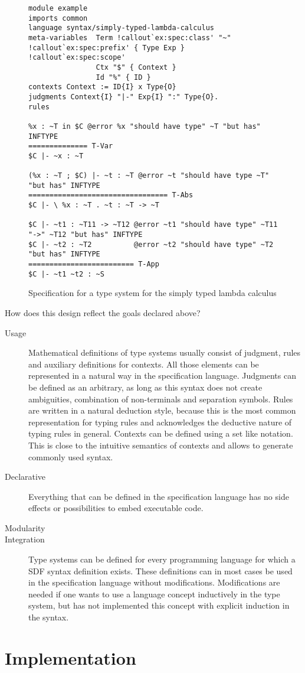 \begin{figure}
\scriptsize
\begin{verbatim}
module example
imports common
language syntax/simply-typed-lambda-calculus
meta-variables 	Term !callout`ex:spec:class' "~" !callout`ex:spec:prefix' { Type Exp } !callout`ex:spec:scope'
                Ctx "$" { Context }
                Id "%" { ID }
contexts Context := ID{I} x Type{O}
judgments Context{I} "|-" Exp{I} ":" Type{O}.
rules

%x : ~T in $C @error %x "should have type" ~T "but has" INFTYPE
============== T-Var
$C |- ~x : ~T

(%x : ~T ; $C) |- ~t : ~T @error ~t "should have type ~T" "but has" INFTYPE
================================= T-Abs
$C |- \ %x : ~T . ~t : ~T -> ~T

$C |- ~t1 : ~T11 -> ~T12 @error ~t1 "should have type" ~T11 "->" ~T12 "but has" INFTYPE
$C |- ~t2 : ~T2          @error ~t2 "should have type" ~T2 "but has" INFTYPE
========================= T-App
$C |- ~t1 ~t2 : ~S
\end{verbatim}
\caption{Specification for a type system for the simply typed lambda calculus}
\end{figure}

How does this design reflect the goals declared above?

\begin{description}
\item[Usage] Mathematical definitions of type systems usually consist
  of judgment, rules and auxiliary definitions for contexts. All
  those elements can be represented in a natural way in the
  specification language. Judgments can be defined as an arbitrary, as long
  as this syntax does not create ambiguities, combination of
  non-terminals and separation symbols. Rules are written in a natural
  deduction style, because this is the most common representation for
  typing rules and acknowledges the deductive nature of typing rules
  in general. Contexts can be defined using a set like
  notation. This is close to the intuitive semantics of contexts
  and allows to generate commonly used syntax.
\item[Declarative] Everything that can be defined in the specification
  language has no side effects or possibilities to embed executable
  code.
\item[Modularity] 
\item[Integration] Type systems can be defined for every programming
  language for which a SDF syntax definition exists. These definitions
  can in most cases be used in the specification language without
  modifications. Modifications are needed if one wants to use a
  language concept inductively in the type system, but has not
  implemented this concept with explicit induction in the
  syntax.
\end{description}
\section{Implementation}
\label{sec:generate-sdf}

